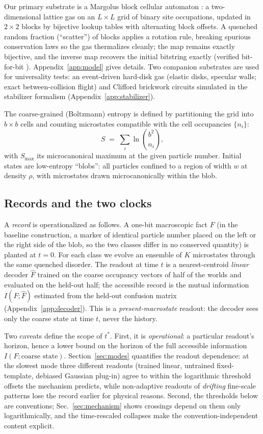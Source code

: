\documentclass[aps,pre,twocolumn,superscriptaddress,nofootinbib,longbibliography]{revtex4-2}
\newcommand{\tstar}{t^{*}}
\newcommand{\Smax}{S_{\max}}
\begin{document}
Our primary substrate is a Margolus block cellular automaton
\cite{margolus1984,toffolimargolus1987}: a two-dimensional lattice gas on an $L\times L$
grid of binary site occupations, updated in $2\times2$ blocks by bijective lookup tables
with alternating block offsets. A quenched random fraction (``scatter'') of blocks applies a
rotation rule, breaking spurious conservation laws so the gas thermalizes cleanly; the map
remains exactly bijective, and the inverse map recovers the initial bitstring exactly
(verified bit-for-bit \cite{repo}). Appendix~\ref{app:model} gives details. Two companion
substrates are used for universality tests: an event-driven hard-disk gas (elastic disks,
specular walls; exact between-collision flight) and Clifford brickwork circuits simulated in
the stabilizer formalism (Appendix~\ref{app:stabilizer}).

The coarse-grained (Boltzmann) entropy is defined by partitioning the grid into $b\times b$
cells and counting microstates compatible with the cell occupancies $\{n_i\}$:
\begin{equation}
S \;=\; \sum_i \ln \binom{b^2}{n_i},
\label{eq:boltzS}
\end{equation}
with $\Smax$ its microcanonical maximum at the given particle number. Initial states are
low-entropy ``blobs'': all particles confined to a region of width $w$ at density $\rho$,
with microstates drawn microcanonically within the blob.

\subsection{Records and the two clocks}

A \emph{record} is operationalized as follows. A one-bit macroscopic fact $F$ (in the
baseline construction, a marker of identical particle number placed on the left or the
right side of the blob, so the two classes differ in no conserved quantity) is planted at
$t=0$. For each class we evolve an ensemble of $K$ microstates through the same quenched
disorder. The readout at time $t$ is a nearest-centroid \emph{linear} decoder $\hat F$
trained on the coarse occupancy vectors of half of the worlds and evaluated on the held-out
half; the accessible record is the mutual information $I(F;\hat F)$ estimated from the
held-out confusion matrix (Appendix~\ref{app:decoder}). This is a
\emph{present-macrostate} readout: the decoder sees only the coarse state at time $t$,
never the history.

Two caveats define the scope of $\tstar$. First, it is \emph{operational}: a particular
readout's horizon, hence a lower bound on the horizon of the full accessible information
$I(F;\text{coarse state})$. Section~\ref{sec:modes} quantifies the readout dependence: at
the slowest mode three different readouts (trained linear, untrained fixed-template,
debiased Gaussian plug-in) agree to within the logarithmic threshold offsets the mechanism
predicts, while non-adaptive readouts of \emph{drifting} fine-scale patterns lose the
record earlier for physical reasons. Second, the thresholds below are conventions;
Sec.~\ref{sec:mechanism} shows crossings depend on them only logarithmically, and the
time-rescaled collapses make the convention-independent content explicit.
\end{document}
